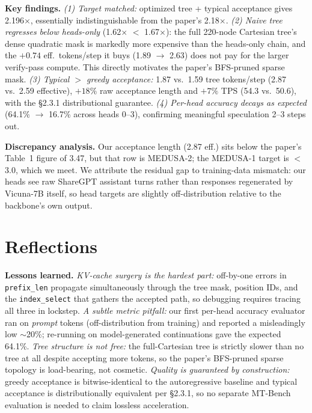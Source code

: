 \documentclass[11pt,letterpaper]{article}
\begin{document}
\textbf{Key findings.} \emph{(1) Target matched:} optimized tree + typical acceptance gives 2.196$\times$, essentially indistinguishable from the paper's 2.18$\times$. \emph{(2) Naive tree regresses below heads-only} (1.62$\times$ $<$ 1.67$\times$): the full 220-node Cartesian tree's dense quadratic mask is markedly more expensive than the heads-only chain, and the $+0.74$ eff.\ tokens/step it buys (1.89 $\to$ 2.63) does not pay for the larger verify-pass compute. This directly motivates the paper's BFS-pruned sparse mask. \emph{(3) Typical $>$ greedy acceptance:} 1.87 vs.\ 1.59 tree tokens/step (2.87 vs.\ 2.59 effective), $+18\%$ raw acceptance length and $+7\%$ TPS (54.3 vs.\ 50.6), with the \S2.3.1 distributional guarantee. \emph{(4) Per-head accuracy decays as expected} (64.1\% $\to$ 16.7\% across heads 0--3), confirming meaningful speculation 2--3 steps out.

\textbf{Discrepancy analysis.} Our acceptance length (2.87 eff.) sits below the paper's Table~1 figure of 3.47, but that row is MEDUSA-2; the MEDUSA-1 target is $<$3.0, which we meet. We attribute the residual gap to training-data mismatch: our heads see raw ShareGPT assistant turns rather than responses regenerated by Vicuna-7B itself, so head targets are slightly off-distribution relative to the backbone's own output.

\section{Reflections}
\textbf{Lessons learned.} \emph{KV-cache surgery is the hardest part:} off-by-one errors in \texttt{prefix\_len} propagate simultaneously through the tree mask, position IDs, and the \texttt{index\_select} that gathers the accepted path, so debugging requires tracing all three in lockstep. \emph{A subtle metric pitfall:} our first per-head accuracy evaluator ran on \emph{prompt} tokens (off-distribution from training) and reported a misleadingly low $\sim$20\%; re-running on model-generated continuations gave the expected 64.1\%. \emph{Tree structure is not free:} the full-Cartesian tree is strictly slower than no tree at all despite accepting more tokens, so the paper's BFS-pruned sparse topology is load-bearing, not cosmetic. \emph{Quality is guaranteed by construction:} greedy acceptance is bitwise-identical to the autoregressive baseline and typical acceptance is distributionally equivalent per \S2.3.1, so no separate MT-Bench evaluation is needed to claim lossless acceleration.
\end{document}
